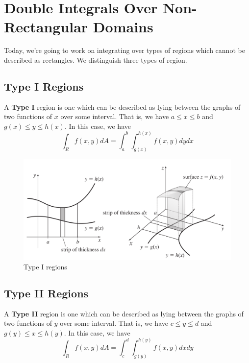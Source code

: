 \documentclass[
]{book}
\theoremstyle{definition}
\theoremstyle{definition}
\theoremstyle{definition}
\theoremstyle{definition}
\theoremstyle{remark}
\begin{document}
\hypertarget{double-integrals-over-non-rectangular-domains}{%
\section{Double Integrals Over Non-Rectangular Domains}\label{double-integrals-over-non-rectangular-domains}}

Today, we're going to work on integrating over types of regions which cannot be described as rectangles. We distinguish three types of region.

\hypertarget{type-i-regions}{%
\subsection{Type I Regions}\label{type-i-regions}}

A \textbf{Type I} region is one which can be described as lying between the graphs of two functions of \(x\) over some interval. That is, we have \(a\leq x\leq b\) and \(g(x)\leq y\leq h(x)\). In this case, we have \[\displaystyle \int_R f(x,y)dA = \int_a^b \int_{g(x)}^{h(x)}f(x,y) dy dx\]

\begin{figure}

{\centering \includegraphics[width=0.75\linewidth]{images/type-i} 

}

\caption{Type I regions}\label{fig:unnamed-chunk-18}
\end{figure}

\hypertarget{type-ii-regions}{%
\subsection{Type II Regions}\label{type-ii-regions}}

A \textbf{Type II} region is one which can be described as lying between the graphs of two functions of \(y\) over some interval. That is, we have \(c\leq y\leq d\) and \(g(y)\leq x\leq h(y)\). In this case, we have \[\displaystyle \int_R f(x,y)dA = \int_c^d \int_{g(y)}^{h(y)}f(x,y) dx dy\]
\end{document}
